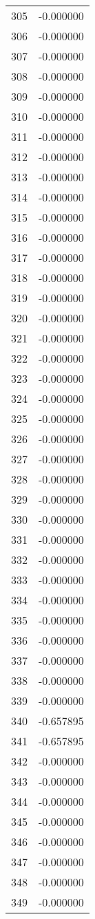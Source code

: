 \documentclass[12pt]{article}
\begin{document}
\begin{longtable}{@{}cc@{}}
305 & -0.000000 \\
306 & -0.000000 \\
307 & -0.000000 \\
308 & -0.000000 \\
309 & -0.000000 \\
310 & -0.000000 \\
311 & -0.000000 \\
312 & -0.000000 \\
313 & -0.000000 \\
314 & -0.000000 \\
315 & -0.000000 \\
316 & -0.000000 \\
317 & -0.000000 \\
318 & -0.000000 \\
319 & -0.000000 \\
320 & -0.000000 \\
321 & -0.000000 \\
322 & -0.000000 \\
323 & -0.000000 \\
324 & -0.000000 \\
325 & -0.000000 \\
326 & -0.000000 \\
327 & -0.000000 \\
328 & -0.000000 \\
329 & -0.000000 \\
330 & -0.000000 \\
331 & -0.000000 \\
332 & -0.000000 \\
333 & -0.000000 \\
334 & -0.000000 \\
335 & -0.000000 \\
336 & -0.000000 \\
337 & -0.000000 \\
338 & -0.000000 \\
339 & -0.000000 \\
340 & -0.657895 \\
341 & -0.657895 \\
342 & -0.000000 \\
343 & -0.000000 \\
344 & -0.000000 \\
345 & -0.000000 \\
346 & -0.000000 \\
347 & -0.000000 \\
348 & -0.000000 \\
349 & -0.000000 \\

\end{longtable}
\end{document}
